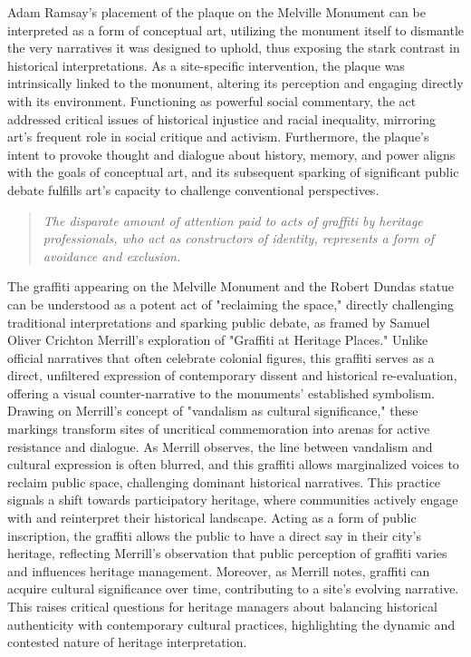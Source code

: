 \documentclass{scrartcl}
\begin{document}
Adam Ramsay's placement of the plaque on the Melville Monument can be interpreted as a form of conceptual art, utilizing the monument itself to dismantle the very narratives it was designed to uphold, thus exposing the stark contrast in historical interpretations. As a site-specific intervention, the plaque was intrinsically linked to the monument, altering its perception and engaging directly with its environment. Functioning as powerful social commentary, the act addressed critical issues of historical injustice and racial inequality, mirroring art's frequent role in social critique and activism. Furthermore, the plaque's intent to provoke thought and dialogue about history, memory, and power aligns with the goals of conceptual art, and its subsequent sparking of significant public debate fulfills art's capacity to challenge conventional perspectives.

\begin{quotation}
\textit{The disparate amount of attention paid to acts of graffiti by heritage professionals, who act as constructors of identity, represents a form of avoidance and exclusion.}
\end{quotation}
\cite{merrill_2011}
The graffiti appearing on the Melville Monument and the Robert Dundas statue can be understood as a potent act of "reclaiming the space," directly challenging traditional interpretations and sparking public debate, as framed by Samuel Oliver Crichton Merrill's exploration of "Graffiti at Heritage Places." Unlike official narratives that often celebrate colonial figures, this graffiti serves as a direct, unfiltered expression of contemporary dissent and historical re-evaluation, offering a visual counter-narrative to the monuments' established symbolism. Drawing on Merrill's concept of "vandalism as cultural significance," these markings transform sites of uncritical commemoration into arenas for active resistance and dialogue. As Merrill observes, the line between vandalism and cultural expression is often blurred, and this graffiti allows marginalized voices to reclaim public space, challenging dominant historical narratives. This practice signals a shift towards participatory heritage, where communities actively engage with and reinterpret their historical landscape. Acting as a form of public inscription, the graffiti allows the public to have a direct say in their city's heritage, reflecting Merrill's observation that public perception of graffiti varies and influences heritage management. Moreover, as Merrill notes, graffiti can acquire cultural significance over time, contributing to a site's evolving narrative. This raises critical questions for heritage managers about balancing historical authenticity with contemporary cultural practices, highlighting the dynamic and contested nature of heritage interpretation.
\end{document}
